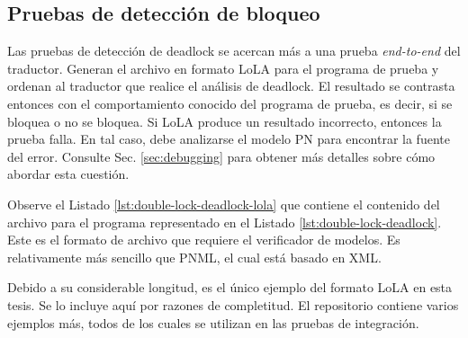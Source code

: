 \subsection{Pruebas de detección de bloqueo}

Las pruebas de detección de deadlock se acercan más a una prueba \emph{end-to-end}
del traductor. Generan el archivo en formato \acrshort{LoLA} para el programa de prueba y ordenan al
traductor que realice el análisis de deadlock. El resultado se contrasta entonces con el
comportamiento conocido del programa de prueba, es decir, si se bloquea o no se bloquea. Si
\acrshort{LoLA} produce un resultado incorrecto, entonces la prueba falla. En tal caso, debe analizarse el
modelo \acrshort{PN} para encontrar la fuente del error.
Consulte Sec. \ref{sec:debugging} para obtener más
detalles sobre cómo abordar esta cuestión.

Observe el Listado \ref{lst:double-lock-deadlock-lola}
que contiene el contenido del archivo  para el programa
representado en el Listado \ref{lst:double-lock-deadlock}.
Este es el formato de archivo que requiere el verificador de
modelos. Es relativamente más sencillo que \acrshort{PNML}, el cual está basado en XML.

Debido a su considerable longitud, es el único ejemplo del formato \acrshort{LoLA} en esta tesis.
Se lo incluye aquí por razones de completitud.
El repositorio contiene varios ejemplos más,
todos de los cuales se utilizan en las pruebas de integración.

